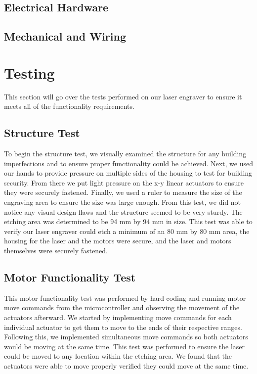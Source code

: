 \documentclass[11pt]{LaTeX-Classes/math-hw}
\begin{document}
\subsection{Electrical Hardware}

\subsection{Mechanical and Wiring}

\section{Testing}
This section will go over the tests performed on our laser engraver to ensure it meets all of the functionality requirements. 

\subsection{Structure Test}
To begin the structure test, we visually examined the structure for any building imperfections and to ensure proper functionality could be achieved. Next, we used our hands to provide pressure on multiple sides of the housing to test for building security. From there we put light pressure on the x-y linear actuators to ensure they were securely fastened. Finally, we used a ruler to measure the size of the engraving area to ensure the size was large enough. From this test, we did not notice any visual design flaws and the structure seemed to be very sturdy. The etching area was determined to be 94 mm by 94 mm in size. This test was able to verify our laser engraver could etch a minimum of an 80 mm by 80 mm area, the housing for the laser and the motors were secure, and the laser and motors themselves were securely fastened.

\subsection{Motor Functionality Test}
This motor functionality test was performed by hard coding and running motor move commands from the microcontroller and observing the movement of the actuators afterward. We started by implementing move commands for each individual actuator to get them to move to the ends of their respective ranges. Following this, we implemented simultaneous move commands so both actuators would be moving at the same time. This test was performed to ensure the laser could be moved to any location within the etching area. We found that the actuators were able to move properly verified they could move at the same time. 
\end{document}
